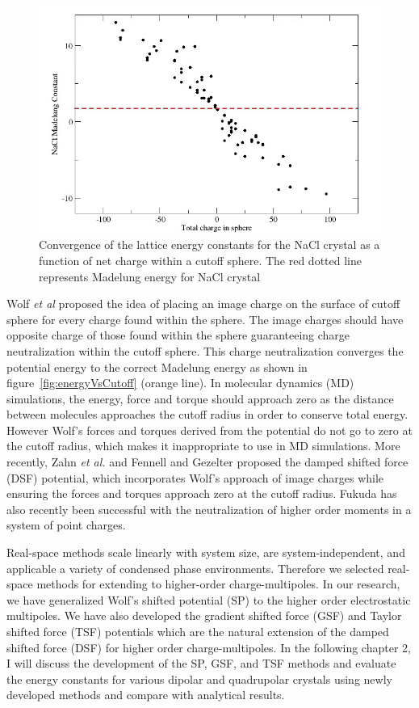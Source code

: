 \begin{figure}[tpb]
  \begin{center}
    \centerline{\includegraphics[width = \linewidth]{energyVsNetcharge.png}}
    \caption{Convergence of the lattice energy constants for the NaCl crystal as a function of net charge within a cutoff sphere. The red dotted line represents Madelung energy for NaCl crystal}
    \label{fig:energyVsCharge}
  \end{center}
\end{figure}
Wolf \textit{et al} \cite{Wolf99} proposed the idea of placing an image charge on the surface of cutoff sphere for every charge found within the sphere. The image charges should have opposite charge of those found within the sphere guaranteeing charge neutralization  within the cutoff sphere.\cite{Wolf99} This charge neutralization converges the potential energy to the correct Madelung energy as shown in figure~\ref{fig:energyVsCutoff} (orange line). In molecular dynamics (MD) simulations, the energy, force and torque should approach zero as the distance between molecules approaches the cutoff radius  in order to conserve total energy. However Wolf's forces and torques derived from the potential do not go to zero at the cutoff radius, which makes it inappropriate to use in MD simulations. More recently, Zahn \textit{et al.} and Fennell and Gezelter proposed the damped shifted force (DSF) potential, which incorporates Wolf's approach of image charges while ensuring the forces and torques approach zero at the cutoff radius.\cite{Zahn02, Gezelter06} Fukuda has also recently been successful with the neutralization of higher order moments in a system of point charges.\cite{Fukuda13}

Real-space methods scale linearly with system size, are system-independent, and applicable a variety of condensed phase environments. Therefore we selected real-space methods for extending to higher-order charge-multipoles. In our research, we have generalized Wolf's shifted potential (SP) to the higher order electrostatic multipoles. We have also developed the gradient shifted force (GSF) and Taylor shifted force (TSF) potentials which are the natural extension of the damped shifted force (DSF) for higher order charge-multipoles. In the following chapter 2, I will discuss the development of the SP, GSF, and TSF methods and evaluate the energy constants for various dipolar and quadrupolar crystals using newly developed methods and compare with analytical results.\cite{Lamichhane14_I} 